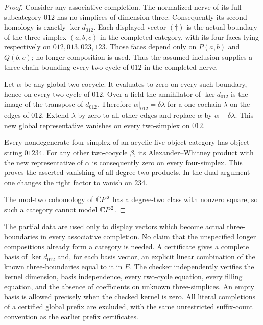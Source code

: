 \begin{proof}
Consider any associative completion. The normalized nerve of its
full subcategory $012$ has no simplices of dimension three.
Consequently its second homology is exactly $\ker d_{012}$.
Each displayed vector \((\dagger)\) is the actual boundary of
the three-simplex $(a,b,c)$ in the completed category, with its
four faces lying respectively on $012,013,023,123$. Those faces
depend only on $P(a,b)$ and $Q(b,c)$; no longer composition is
used. Thus the assumed inclusion supplies a three-chain bounding
every two-cycle of $012$ in the completed nerve.

Let $\alpha$ be any global two-cocycle. It evaluates to zero on
every such boundary, hence on every two-cycle of $012$.
Over a field the annihilator of $\ker d_{012}$ is the image of
the transpose of $d_{012}$. Therefore
$\alpha|_{012}=\delta\lambda$ for a one-cochain $\lambda$ on
the edges of $012$. Extend $\lambda$ by zero to all other edges
and replace $\alpha$ by $\alpha-\delta\lambda$. This new global
representative vanishes on every two-simplex on $012$.

Every nondegenerate four-simplex of an acyclic five-object
category has object string $01234$. For any other two-cocycle
$\beta$, its Alexander--Whitney product with the new
representative of $\alpha$ is consequently zero on every
four-simplex. This proves the asserted vanishing of all
degree-two products. In the dual argument one changes the
right factor to vanish on $234$.

The mod-two cohomology of $\mathbb{C}P^2$ has a degree-two class with
nonzero square, so such a category cannot model $\mathbb{C}P^2$.
\end{proof}

\begin{remark*}
The partial data are used only to display vectors which become
actual three-boundaries in every associative completion. No
claim that the unspecified longer compositions already form a
category is needed. A certificate gives a complete basis of
$\ker d_{012}$ and, for each basis vector, an explicit linear
combination of the known three-boundaries equal to it in $E$.
The checker independently verifies the kernel dimension, basis
independence, every two-cycle equation, every filling equation,
and the absence of coefficients on unknown three-simplices.
An empty basis is allowed precisely when the checked kernel is
zero. All literal completions of a certified global prefix are
excluded, with the same unrestricted suffix-count convention as
the earlier prefix certificates.
\end{remark*}
